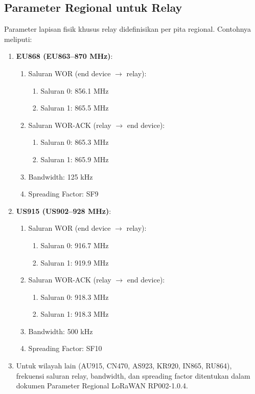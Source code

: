 \subsection{Parameter Regional untuk Relay}
Parameter lapisan fisik khusus relay didefinisikan per pita regional. Contohnya meliputi:
\begin{enumerate}
    \item \textbf{EU868 (EU863–870 MHz)}:
          \begin{enumerate}
              \item Saluran WOR (end device $\rightarrow$ relay):
                    \begin{enumerate}
                        \item Saluran 0: 856.1 MHz
                        \item Saluran 1: 865.5 MHz
                    \end{enumerate}
              \item Saluran WOR-ACK (relay $\rightarrow$ end device):
                    \begin{enumerate}
                        \item Saluran 0: 865.3 MHz
                        \item Saluran 1: 865.9 MHz
                    \end{enumerate}
              \item Bandwidth: 125 kHz
              \item Spreading Factor: SF9
          \end{enumerate}
    \item \textbf{US915 (US902–928 MHz)}:
          \begin{enumerate}
              \item Saluran WOR (end device $\rightarrow$ relay):
                    \begin{enumerate}
                        \item Saluran 0: 916.7 MHz
                        \item Saluran 1: 919.9 MHz
                    \end{enumerate}
              \item Saluran WOR-ACK (relay $\rightarrow$ end device):
                    \begin{enumerate}
                        \item Saluran 0: 918.3 MHz
                        \item Saluran 1: 918.3 MHz
                    \end{enumerate}
              \item Bandwidth: 500 kHz
              \item Spreading Factor: SF10
          \end{enumerate}
    \item Untuk wilayah lain (AU915, CN470, AS923, KR920, IN865, RU864), frekuensi saluran relay, bandwidth, dan spreading factor ditentukan dalam dokumen Parameter Regional LoRaWAN RP002-1.0.4.
\end{enumerate}

